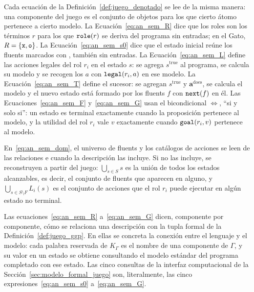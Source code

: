 Cada ecuación de la Definición~\ref{def:juego_denotado} se lee de la misma manera: una componente del juego es el conjunto de objetos para los que cierto átomo pertenece a cierto modelo. La Ecuación~\eqref{eq:an_sem_R} dice que los roles son los términos $r$ para los que $\texttt{role}(r)$ se deriva del programa sin entradas; en el Gato, $R = \{\texttt{x}, \texttt{o}\}$. La Ecuación~\eqref{eq:an_sem_s0} dice que el estado inicial reúne los fluents marcados con , también sin entradas. La Ecuación~\eqref{eq:an_sem_L} define las acciones legales del rol $r_i$ en el estado $s$: se agrega $s^{\mathrm{true}}$ al programa, se calcula su modelo y se recogen los $a$ con $\texttt{legal}(r_i, a)$ en ese modelo. La Ecuación~\eqref{eq:an_sem_T} define el sucesor: se agregan $s^{\mathrm{true}}$ y $\mathbf a^{\mathrm{does}}$, se calcula el modelo y el nuevo estado está formado por los fluents $f$ con $\texttt{next}(f)$ en él. Las Ecuaciones~\eqref{eq:an_sem_F} y~\eqref{eq:an_sem_G} usan el bicondicional $\iff$, ``si y solo si'': un estado es terminal exactamente cuando la proposición  pertenece al modelo, y la utilidad del rol $r_i$ vale $v$ exactamente cuando $\texttt{goal}(r_i, v)$ pertenece al modelo.

En~\eqref{eq:an_sem_dom}, el universo de fluents y los catálogos de acciones se leen de las relaciones  e  cuando la descripción las incluye. Si no las incluye, se reconstruyen a partir del juego: $\bigcup_{s \in S} s$ es la unión de todos los estados alcanzables, es decir, el conjunto de fluents que aparecen en alguno, y $\bigcup_{s \in S \setminus F} L_i(s)$ es el conjunto de acciones que el rol $r_i$ puede ejecutar en algún estado no terminal.

Las ecuaciones~\eqref{eq:an_sem_R} a~\eqref{eq:an_sem_G} dicen, componente por componente, cómo se relaciona una descripción con la tupla formal de la Definición~\ref{def:juego_ggp}. En ellas se concreta la conexión entre el lenguaje y el modelo: cada palabra reservada de $K_\Gamma$ es el nombre de una componente de $\Gamma$, y su valor en un estado se obtiene consultando el modelo estándar del programa completado con ese estado. Las cinco consultas de la interfaz computacional de la Sección~\ref{sec:modelo_formal_juego} son, literalmente, las cinco expresiones~\eqref{eq:an_sem_s0} a~\eqref{eq:an_sem_G}.

